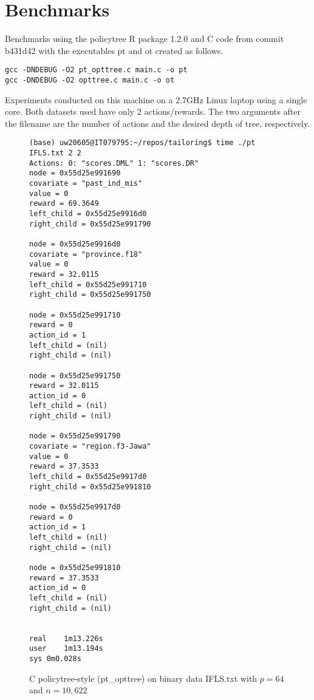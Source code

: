 \documentclass{article}
\begin{document}
\section{Benchmarks}
\label{sec:benchmarks}

Benchmarks using the policytree R package 1.2.0 and C code from commit b431d42 with the executables pt
and ot created as follows.

\begin{verbatim}
gcc -DNDEBUG -O2 pt_opttree.c main.c -o pt
gcc -DNDEBUG -O2 opttree.c main.c -o ot
\end{verbatim}

Experiments conducted on this machine on a 2.7GHz Linux laptop using a
single core. Both datasets used have only 2 actions/rewards. The two
arguments after the filename are the number of actions and the desired
depth of tree, respectively.


\begin{figure}
  \centering
\begin{verbatim}
(base) uw20605@IT079795:~/repos/tailoring$ time ./pt IFLS.txt 2 2 
Actions: 0: "scores.DML" 1: "scores.DR" 
node = 0x55d25e991690
covariate = "past_ind_mis"
value = 0
reward = 69.3649
left_child = 0x55d25e9916d0
right_child = 0x55d25e991790

node = 0x55d25e9916d0
covariate = "province.f18"
value = 0
reward = 32.0115
left_child = 0x55d25e991710
right_child = 0x55d25e991750

node = 0x55d25e991710
reward = 0
action_id = 1
left_child = (nil)
right_child = (nil)

node = 0x55d25e991750
reward = 32.0115
action_id = 0
left_child = (nil)
right_child = (nil)

node = 0x55d25e991790
covariate = "region.f3-Jawa"
value = 0
reward = 37.3533
left_child = 0x55d25e9917d0
right_child = 0x55d25e991810

node = 0x55d25e9917d0
reward = 0
action_id = 1
left_child = (nil)
right_child = (nil)

node = 0x55d25e991810
reward = 37.3533
action_id = 0
left_child = (nil)
right_child = (nil)


real	1m13.226s
user	1m13.194s
sys	0m0.028s
\end{verbatim}
  \caption{C policytree-style (pt\_opttree) on binary data IFLS.txt
    with $p=64$ and $n=10,622$}
\end{figure}
\end{document}
